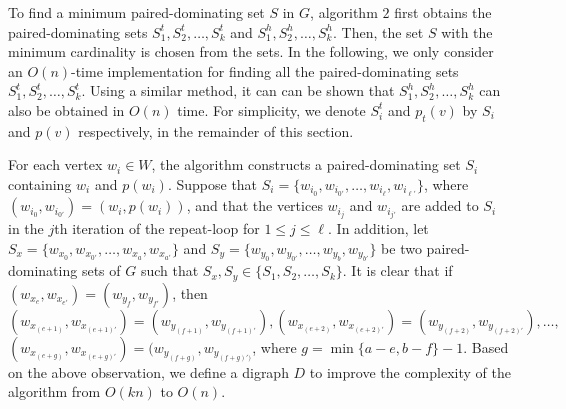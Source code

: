 \documentclass[12pt]{article}
\newcommand{\setof}[1]{\{{#1}\}}
\begin{document}
To find a minimum paired-dominating set $S$ in $G$, algorithm $2$
first obtains the paired-dominating sets
$S^t_1,S^t_2,\ldots,S^t_k$ and $S^h_1,S^h_2,\ldots,S^h_k$. Then,
the set $S$ with the minimum cardinality is chosen from the sets.
In the following, we only consider an $O(n)$-time implementation
for finding all the paired-dominating sets
$S^t_1,S^t_2,\ldots,S^t_k$. Using a similar method, it can can be
shown that $S^h_1,S^h_2,\ldots,S^h_k$ can also be obtained in
$O(n)$ time. For simplicity, we denote $S^t_i$ and $p_t(v)$ by
$S_i$ and $p(v)$ respectively, in the remainder of this section.

For each vertex $w_i \in W$, the algorithm constructs a
paired-dominating set $S_i$ containing $w_i$ and $p(w_i)$. Suppose
that $S_i = \{w_{i_{0}}, w_{i_{0'}},\ldots,
w_{i_{\ell}},w_{i_{\ell'}}\}$, where $(w_{i_{0}},
w_{i_{0'}})=(w_i,p(w_i))$, and that the vertices $w_{i_{j}}$ and
$w_{i_{j'}}$ are added to $S_i$ in the $j$th iteration of the
repeat-loop for $1 \le j \le \ell$. In addition, let
$S_x=\{w_{x_{0}}, w_{x_{0'}},\ldots, w_{x_{a}},w_{x_{a'}}\}$ and
$S_y=\{w_{y_{0}}, w_{y_{0'}},\ldots, w_{y_{b}},w_{y_{b'}}\}$ be
two paired-dominating sets of $G$ such that $S_x, S_y \in
\setof{S_1,S_2,\ldots,S_k}$. It is clear that if $(w_{x_{e}},
w_{x_{e'}})= (w_{y_{f}}, w_{y_{f'}})$, then $(w_{x_{(e+1)}},
w_{x_{(e+1)'}}) = (w_{y_{(f+1)}}, w_{y_{(f+1)'}}),(w_{x_{(e+2)}},
w_{x_{(e+2)'}})= (w_{y_{(f+2)}}, w_{y_{(f+2)'}}),\ldots,$
$(w_{x_{(e+g)}}, w_{x_{(e+g)'}})= (w_{y_{(f+g)}},
w_{y_{(f+g)')}}$, where $g = \min \setof{a-e,b-f}-1$. Based on the
above observation, we define a digraph $D$ to improve the
complexity of the algorithm from $O(kn)$ to $O(n)$.

\vspace{14pt}
\end{document}

